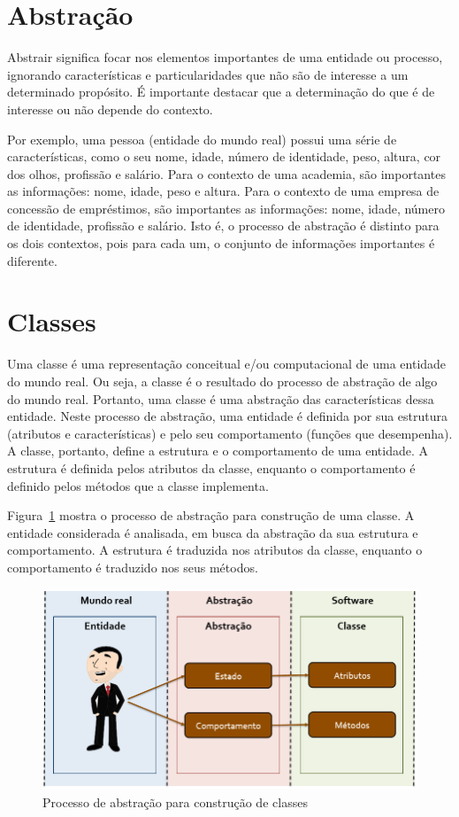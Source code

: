 \section{Abstração}
Abstrair significa focar nos elementos importantes de uma entidade ou processo, ignorando características e particularidades que não são de interesse a um determinado propósito. É importante destacar que a determinação do que é de interesse ou não depende do contexto.

Por exemplo, uma pessoa (entidade do mundo real) possui uma série de características, como o seu nome, idade, número de identidade, peso, altura, cor dos olhos, profissão e salário. Para o contexto de uma academia, são importantes as informações: nome, idade, peso e altura. Para o contexto de uma empresa de concessão de empréstimos, são importantes as informações: nome, idade, número de identidade, profissão e salário. Isto é, o processo de abstração é distinto para os dois contextos, pois para cada um, o conjunto de informações importantes é diferente.

\section{Classes}
Uma classe é uma representação conceitual e/ou computacional de uma entidade do mundo real. Ou seja, a classe é o resultado do processo de abstração de algo do mundo real. Portanto, uma classe é uma abstração das características dessa entidade. Neste processo de abstração, uma entidade é definida por sua estrutura (atributos e características) e pelo seu comportamento (funções que desempenha). A classe, portanto, define a estrutura e o comportamento de uma entidade. A estrutura é definida pelos atributos da classe, enquanto o comportamento é definido pelos métodos que a classe implementa.

Figura~\ref{fig:processo-abstracao} mostra o processo de abstração para construção de uma classe. A entidade considerada é analisada, em busca da abstração da sua estrutura e comportamento. A estrutura é traduzida nos atributos da classe, enquanto o comportamento é traduzido nos seus métodos.

\begin{figure}[h]
	\centering
	\includegraphics[width=0.6\textheight]{img/processo-abstracao.png}
	\caption{Processo de abstração para construção de classes}
	\label{fig:processo-abstracao}
\end{figure}

